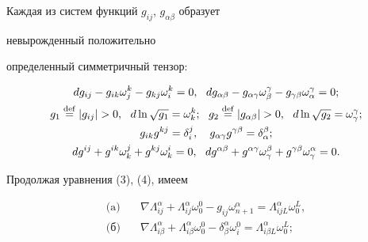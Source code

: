 Каждая из систем функций $g_{i j}$, $g_{\alpha\beta}$ образует 


невырожденный положительно 


определенный симметричный тензор: 


\begin{gather} 


d g_{i j}-g_{i k}\omega^k_j-g_{k j}\omega^k_i=0, 


\ \ d g_{\alpha\beta}-g_{\alpha\gamma}\omega^\gamma_\beta- 


g_{\gamma\beta}\omega^\gamma_\alpha=0;\\ 


g_1\eqdef|g_{i j}|>0,\ \ d\ln\sqrt{g_1}=\omega^k_k; 


\ \ g_2\eqdef |g_{\alpha\beta}|>0, 


\ \ d\ln\sqrt{g_2}=\omega^\gamma_\gamma;\\ 


g_{i k}g^{k j}=\delta^j_i, \quad


g_{\alpha\gamma}g^{\gamma\beta}=\delta^\beta_\alpha;\notag \\ 


d g^{i j}+g^{i k}\omega^j_k+g^{k j}\omega^i_k=0, 


\ \ d g^{\alpha\beta}+g^{\alpha\gamma}\omega^\beta_\gamma 


+g^{\gamma\beta}\omega^\alpha_\gamma=0. 


\end{gather} 


 


Продолжая уравнения (3), (4), имеем 


\begin{equation} 


\begin{split} 


\text{(a)} \quad & \nabla\Lambda^\alpha_{i j}+ 


\Lambda^\alpha_{i j}\omega^0_0-g_{i j}\omega^\alpha_{n+1}= 


\Lambda^\alpha_{i j L}\omega^L_0,\\ 


\text{(б)} \quad & \nabla\Lambda^\alpha_{i\beta}+ 


\Lambda^\alpha_{i\beta}\omega^0_0-\delta^\alpha_\beta 


\omega^0_i=\Lambda^\alpha_{i\beta L}\omega^L_0; 


\end{split} 


\end{equation} 



